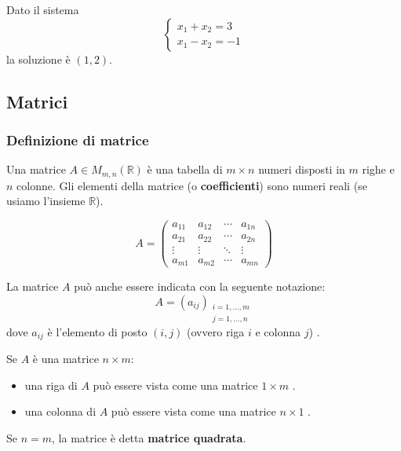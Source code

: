 \documentclass[
  a4paper,
]{article}
\providecommand{\tightlist}{%
  \setlength{\itemsep}{0pt}\setlength{\parskip}{0pt}}
\providecommand{\tightlist}{}
\begin{document}
\begin{examplebox}
Dato il sistema \[
\begin{cases}
x_1 + x_2 = 3\\
x_1 - x_2 = -1
\end{cases}
\] la soluzione è \((1, 2)\).
\end{examplebox}

\hypertarget{matrici}{%
\subsection{Matrici}\label{matrici}}

\hypertarget{definizione-di-matrice}{%
\subsubsection{Definizione di matrice}\label{definizione-di-matrice}}

\begin{definitionbox}
Una matrice \(A \in M_{m, n} (\mathbb{R})\) è una tabella di
\(m \times n\) numeri disposti in \(m\) righe e \(n\) colonne. Gli
elementi della matrice (o \textbf{coefficienti}) sono numeri reali (se
usiamo l'insieme \(\mathbb{R}\)).

\[
A=
\begin{pmatrix}
a_{11} & a_{12} & \cdots & a_{1n}\\
a_{21} & a_{22} & \cdots & a_{2n}\\
\vdots & \vdots & \ddots & \vdots\\
a_{m1} & a_{m2} & \cdots & a_{mn}
\end{pmatrix}
\]

La matrice \(A\) può anche essere indicata con la seguente notazione: \[
A = (a_{ij})_{\substack{i=1,\ldots,m\\ j=1,\ldots,n}}
\] dove \(a_{ij}\) è l'elemento di posto \((i, j)\) (ovvero riga \(i\) e
colonna \(j\)) .
\end{definitionbox}

Se \(A\) è una matrice \(n\times m\):

\begin{itemize}
\tightlist
\item
  una riga di \(A\) può essere vista come una matrice \(1\times m\) .
\item
  una colonna di \(A\) può essere vista come una matrice \(n \times 1\)
  .
\end{itemize}

Se \(n = m\), la matrice è detta \textbf{matrice quadrata}.
\end{document}
